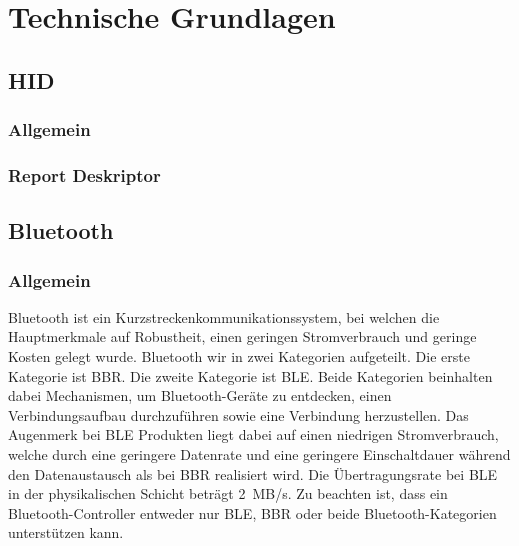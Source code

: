 
\chapter{Technische Grundlagen}

\section{\acf{HID}}

\subsection{Allgemein}

\subsection{Report Deskriptor}

\section{Bluetooth}

\subsection{Allgemein}

Bluetooth ist ein Kurzstreckenkommunikationssystem, bei welchen die Hauptmerkmale auf Robustheit, einen geringen Stromverbrauch und geringe Kosten gelegt wurde. Bluetooth wir in zwei Kategorien aufgeteilt. Die erste Kategorie ist \ac{BBR}. Die zweite Kategorie ist \ac{BLE}. Beide Kategorien beinhalten dabei Mechanismen, um Bluetooth-Geräte zu entdecken, einen Verbindungsaufbau durchzuführen sowie eine Verbindung herzustellen. Das Augenmerk bei \ac{BLE} Produkten liegt dabei auf einen niedrigen Stromverbrauch, welche durch eine geringere Datenrate und eine geringere Einschaltdauer während den Datenaustausch als bei \ac{BBR} realisiert wird. Die Übertragungsrate bei \ac{BLE} in der physikalischen Schicht beträgt 2~MB/s. Zu beachten ist, dass ein Bluetooth-Controller entweder nur \ac{BLE}, \ac{BBR} oder beide Bluetooth-Kategorien unterstützen kann. \cite[S.~187]{bluetoothCore}

